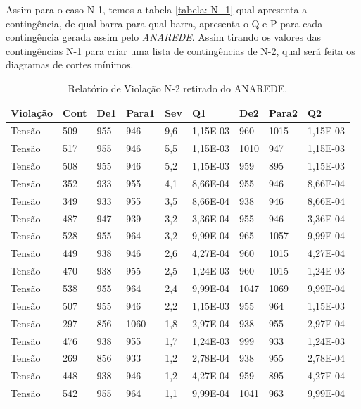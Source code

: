 \documentclass[lettersize,journal]{IEEEtran}
\begin{document}
Assim para o caso N-1, temos a tabela \ref{tabela: N_1} qual apresenta a contingência, de qual barra para qual barra, apresenta o Q e P para cada contingência gerada assim pelo \emph{ANAREDE}. Assim tirando os valores das contingências N-1 para criar uma lista de contingências de N-2, qual será feita os diagramas de cortes mínimos.


\begin{table}[!ht]
	\caption{Relatório de Violação N-2 retirado do ANAREDE.}
	\label{tabela: N_2}
	\centering
	\begin{tabularx}{.5\textwidth}{|Y|Y|Y|Y|Y|Y|Y|Y|Y|}
		\hline
		Violação & Cont & De1 & Para1 & Sev & Q1 & De2 & Para2 & Q2 \\ \hline
		Tensão & 509 & 955 & 946 & 9,6 & 1,15E-03 & 960 & 1015 & 1,15E-03 \\ \hline
		Tensão & 517 & 955 & 946 & 5,5 & 1,15E-03 & 1010 & 947 & 1,15E-03 \\ \hline
		Tensão & 508 & 955 & 946 & 5,2 & 1,15E-03 & 959 & 895 & 1,15E-03 \\ \hline
		Tensão & 352 & 933 & 955 & 4,1 & 8,66E-04 & 955 & 946 & 8,66E-04 \\ \hline
		Tensão & 349 & 933 & 955 & 3,5 & 8,66E-04 & 938 & 946 & 8,66E-04 \\ \hline
		Tensão & 487 & 947 & 939 & 3,2 & 3,36E-04 & 955 & 946 & 3,36E-04 \\ \hline
		Tensão & 528 & 955 & 964 & 3,2 & 9,99E-04 & 965 & 1057 & 9,99E-04 \\ \hline
		Tensão & 449 & 938 & 946 & 2,6 & 4,27E-04 & 960 & 1015 & 4,27E-04 \\ \hline
		Tensão & 470 & 938 & 955 & 2,5 & 1,24E-03 & 960 & 1015 & 1,24E-03 \\ \hline
		Tensão & 538 & 955 & 964 & 2,4 & 9,99E-04 & 1047 & 1069 & 9,99E-04 \\ \hline
		Tensão & 507 & 955 & 946 & 2,2 & 1,15E-03 & 955 & 964 & 1,15E-03 \\ \hline
		Tensão & 297 & 856 & 1060 & 1,8 & 2,97E-04 & 938 & 955 & 2,97E-04 \\ \hline
		Tensão & 476 & 938 & 955 & 1,7 & 1,24E-03 & 999 & 933 & 1,24E-03 \\ \hline
		Tensão & 269 & 856 & 933 & 1,2 & 2,78E-04 & 938 & 955 & 2,78E-04 \\ \hline
		Tensão & 448 & 938 & 946 & 1,2 & 4,27E-04 & 959 & 895 & 4,27E-04 \\ \hline
		Tensão & 542 & 955 & 964 & 1,1 & 9,99E-04 & 1041 & 963 & 9,99E-04 \\ \hline

\end{tabularx}
\end{table}
\end{document}
